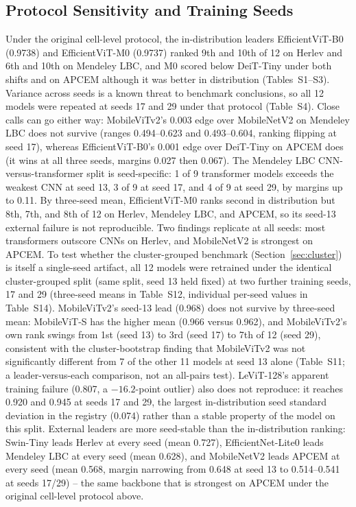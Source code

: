 \documentclass[12pt,letterpaper]{article}
\begin{document}
\subsection{Protocol Sensitivity and Training Seeds}
\label{sec:seeds}
Under the original cell-level protocol, the in-distribution leaders EfficientViT-B0 (0.9738) and EfficientViT-M0 (0.9737) ranked 9th and 10th of 12 on Herlev and 6th and 10th on Mendeley LBC, and M0 scored below DeiT-Tiny under both shifts and on APCEM although it was better in distribution (Tables~S1--S3). Variance across seeds is a known threat to benchmark conclusions,\cite{picard2021,bouthillier2021} so all 12 models were repeated at seeds 17 and 29 under that protocol (Table~S4). Close calls can go either way: MobileViTv2's 0.003 edge over MobileNetV2 on Mendeley LBC does not survive (ranges 0.494--0.623 and 0.493--0.604, ranking flipping at seed 17), whereas EfficientViT-B0's 0.001 edge over DeiT-Tiny on APCEM does (it wins at all three seeds, margins 0.027 then 0.067). The Mendeley LBC CNN-versus-transformer split is seed-specific: 1 of 9 transformer models exceeds the weakest CNN at seed 13, 3 of 9 at seed 17, and 4 of 9 at seed 29, by margins up to 0.11. By three-seed mean, EfficientViT-M0 ranks second in distribution but 8th, 7th, and 8th of 12 on Herlev, Mendeley LBC, and APCEM, so its seed-13 external failure is not reproducible. Two findings replicate at all seeds: most transformers outscore CNNs on Herlev, and MobileNetV2 is strongest on APCEM. To test whether the cluster-grouped benchmark (Section~\ref{sec:cluster}) is itself a single-seed artifact, all 12 models were retrained under the identical cluster-grouped split (same split, seed 13 held fixed) at two further training seeds, 17 and 29 (three-seed means in Table~S12, individual per-seed values in Table~S14). MobileViTv2's seed-13 lead (0.968) does not survive by three-seed mean: MobileViT-S has the higher mean (0.966 versus 0.962), and MobileViTv2's own rank swings from 1st (seed 13) to 3rd (seed 17) to 7th of 12 (seed 29), consistent with the cluster-bootstrap finding that MobileViTv2 was not significantly different from 7 of the other 11 models at seed 13 alone (Table~S11; a leader-versus-each comparison, not an all-pairs test). LeViT-128's apparent training failure (0.807, a $-16.2$-point outlier) also does not reproduce: it reaches 0.920 and 0.945 at seeds 17 and 29, the largest in-distribution seed standard deviation in the registry (0.074) rather than a stable property of the model on this split. External leaders are more seed-stable than the in-distribution ranking: Swin-Tiny leads Herlev at every seed (mean 0.727), EfficientNet-Lite0 leads Mendeley LBC at every seed (mean 0.628), and MobileNetV2 leads APCEM at every seed (mean 0.568, margin narrowing from 0.648 at seed 13 to 0.514--0.541 at seeds 17/29) -- the same backbone that is strongest on APCEM under the original cell-level protocol above.
\end{document}
